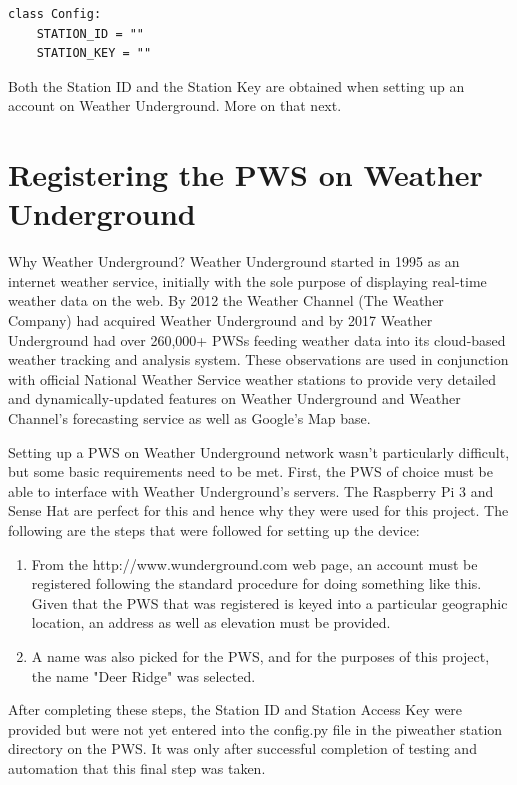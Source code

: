 \documentclass[sigconf]{acmart}
\begin{document}
\begin{verbatim}
class Config:
    STATION_ID = ""
    STATION_KEY = ""
\end{verbatim}


Both the Station ID and the Station Key are obtained when setting up an account on Weather Underground. More on that next.

\section{Registering the PWS on Weather Underground}

Why Weather Underground? Weather Underground started in 1995 as an internet weather service, initially with the sole purpose of displaying real-time weather data on the web. By 2012 the Weather Channel (The Weather Company) had acquired Weather Underground and by 2017 Weather Underground had over 260,000+ PWSs feeding weather data into its cloud-based weather tracking and analysis system. These observations are used in conjunction with official National Weather Service weather stations to provide very detailed and dynamically-updated features on Weather Underground and Weather Channel's forecasting service as well as Google's Map base.

Setting up a PWS on Weather Underground network wasn't particularly difficult, but some basic requirements need to be met. First, the PWS of choice must be able to interface with Weather Underground's servers. The Raspberry Pi 3 and Sense Hat are perfect for this and hence why they were used for this project. The following are the steps that were followed for setting up the device:

\begin{enumerate}
    \item From the http://www.wunderground.com web page, an account must be registered following the standard procedure for doing something like this. Given that the PWS that was registered is keyed into a particular geographic location, an address as well as elevation must be provided. 
    \item A name was also picked for the PWS, and for the purposes of this project, the name "Deer Ridge" was selected.
\end{enumerate}

After completing these steps, the Station ID and Station Access Key were provided but were not yet entered into the config.py file in the pi\textunderscore weather \textunderscore station directory on the PWS. It was only after successful completion of testing and automation that this final step was taken.
\end{document}
